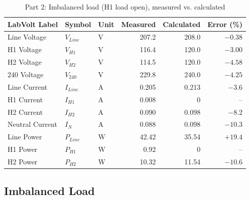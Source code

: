 \begin{table}[htbp]
	\centering
	\caption{Part 2: Imbalanced load (H1 load open), measured vs. calculated}
	\label{tab:part2imb}
	\begin{tabular}{lllrrr}
		\toprule
		\textbf{LabVolt Label} & \textbf{Symbol} & \textbf{Unit} & \textbf{Measured} & \textbf{Calculated} & \textbf{Error (\%)} \\
		\midrule
		Line Voltage           & $V_{Line}$      & V             & 207.2             & 208.0               & $-0.38$             \\
		H1 Voltage             & $V_{H1}$        & V             & 116.4             & 120.0               & $-3.00$             \\
		H2 Voltage             & $V_{H2}$        & V             & 114.5             & 120.0               & $-4.58$             \\
		240 Voltage            & $V_{240}$       & V             & 229.8             & 240.0               & $-4.25$             \\
		Line Current           & $I_{Line}$      & A             & 0.205             & 0.213               & $-3.6$              \\
		H1 Current             & $I_{H1}$        & A             & 0.008             & 0                   & --                  \\
		H2 Current             & $I_{H2}$        & A             & 0.090             & 0.098               & $-8.2$              \\
		Neutral Current        & $I_{N}$         & A             & 0.088             & 0.098               & $-10.3$             \\
		Line Power             & $P_{Line}$      & W             & 42.42             & 35.54               & $+19.4$             \\
		H1 Power               & $P_{H1}$        & W             & 0.92              & 0                   & --                  \\
		H2 Power               & $P_{H2}$        & W             & 10.32             & 11.54               & $-10.6$             \\
		\bottomrule
	\end{tabular}
\end{table}

\subsection{Imbalanced Load}
